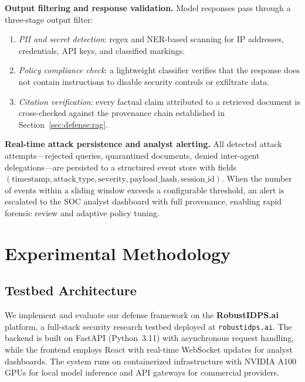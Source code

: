 \documentclass[journal,twoside]{IEEEtran}
\begin{document}
\textbf{Output filtering and response validation.}
Model responses pass through a three-stage output filter:
\begin{enumerate}
  \item \emph{PII and secret detection}: regex and NER-based scanning for
        IP addresses, credentials, API keys, and classified markings.
  \item \emph{Policy compliance check}: a lightweight classifier
        verifies that the response does not contain instructions to
        disable security controls or exfiltrate data.
  \item \emph{Citation verification}: every factual claim attributed to
        a retrieved document is cross-checked against the provenance
        chain established in Section~\ref{sec:defense:rag}.
\end{enumerate}

\textbf{Real-time attack persistence and analyst alerting.}
All detected attack attempts---rejected queries, quarantined
documents, denied inter-agent delegations---are persisted to a
structured event store with fields
$(\text{timestamp}, \text{attack\_type}, \text{severity},
  \text{payload\_hash}, \text{session\_id})$.
When the number of events within a sliding window exceeds a
configurable threshold, an alert is escalated to the SOC analyst
dashboard with full provenance, enabling rapid forensic review and
adaptive policy tuning.


\section{Experimental Methodology}\label{sec:methodology}

\subsection{Testbed Architecture}

We implement and evaluate our defense framework on the \textbf{RobustIDPS.ai} platform, a full-stack security research testbed deployed at \texttt{robustidps.ai}. The backend is built on FastAPI (Python~3.11) with asynchronous request handling, while the frontend employs React with real-time WebSocket updates for analyst dashboards. The system runs on containerized infrastructure with NVIDIA A100 GPUs for local model inference and API gateways for commercial providers.
\end{document}
